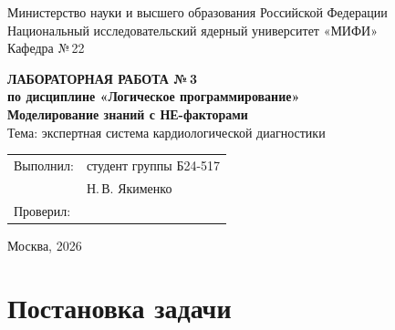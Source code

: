 \documentclass[14pt,a4paper]{extarticle}
\begin{document}
\pagestyle{empty}

\begin{center}
{\small Министерство науки и высшего образования Российской Федерации}\\[0.4em]
{\small Национальный исследовательский ядерный университет «МИФИ»}\\[0.4em]
{\small Кафедра №\,22}
\end{center}

\vfill

\begin{center}
\textbf{ЛАБОРАТОРНАЯ РАБОТА №\,3}\\[0.5em]
\textbf{по дисциплине «Логическое программирование»}\\[1.5em]
\textbf{Моделирование знаний с НЕ-факторами}\\[1em]
Тема: экспертная система кардиологической диагностики
\end{center}

\vfill

\begin{flushright}
\begin{tabular}{@{}ll@{}}
Выполнил: & студент группы Б24-517 \\
          & Н.\,В. Якименко \\[1em]
Проверил: & \underline{\hspace{5cm}} \\
\end{tabular}
\end{flushright}

\vfill

\begin{center}
Москва, 2026
\end{center}

\clearpage
\pagestyle{plain}
\setcounter{page}{2}

\tableofcontents

\clearpage

\section{Постановка задачи}
\end{document}
